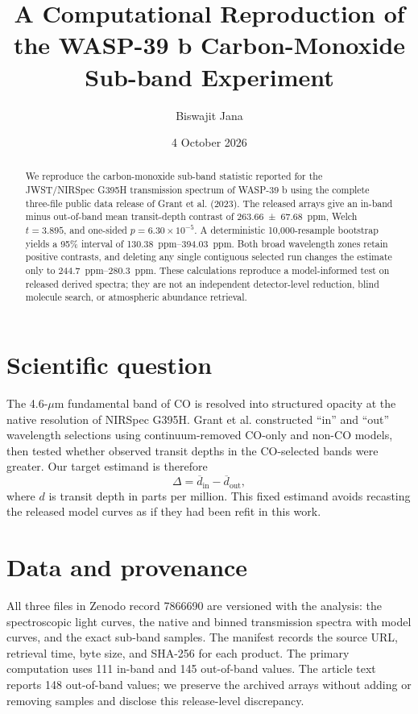 \documentclass[11pt]{article}
\title{A Computational Reproduction of the WASP-39 b Carbon-Monoxide Sub-band Experiment}
\author{Biswajit Jana}
\date{4 October 2026}
\begin{document}
\maketitle

\begin{abstract}
We reproduce the carbon-monoxide sub-band statistic reported for the
JWST/NIRSpec G395H transmission spectrum of WASP-39 b using the complete
three-file public data release of Grant et al. (2023).  The released arrays
give an in-band minus out-of-band mean transit-depth contrast of
\SI{263.66 +- 67.68}{ppm}, Welch $t=3.895$, and one-sided
$p=6.30\times10^{-5}$.  A deterministic 10,000-resample bootstrap yields a
95\% interval of \SIrange{130.38}{394.03}{ppm}.  Both broad wavelength zones
retain positive contrasts, and deleting any single contiguous selected run
changes the estimate only to \SIrange{244.7}{280.3}{ppm}.  These calculations
reproduce a model-informed test on released derived spectra; they are not an
independent detector-level reduction, blind molecule search, or atmospheric
abundance retrieval.
\end{abstract}

\section{Scientific question}
The 4.6-$\mu$m fundamental band of CO is resolved into structured opacity at
the native resolution of NIRSpec G395H.  Grant et al. constructed ``in'' and
``out'' wavelength selections using continuum-removed CO-only and non-CO
models, then tested whether observed transit depths in the CO-selected bands
were greater.  Our target estimand is therefore
\begin{equation}
  \Delta = \overline{d}_{\mathrm{in}}-\overline{d}_{\mathrm{out}},
\end{equation}
where $d$ is transit depth in parts per million.  This fixed estimand avoids
recasting the released model curves as if they had been refit in this work.

\section{Data and provenance}
All three files in Zenodo record 7866690 are versioned with the analysis:
the spectroscopic light curves, the native and binned transmission spectra
with model curves, and the exact sub-band samples.  The manifest records the
source URL, retrieval time, byte size, and SHA-256 for each product.  The
primary computation uses 111 in-band and 145 out-of-band values.  The article
text reports 148 out-of-band values; we preserve the archived arrays without
adding or removing samples and disclose this release-level discrepancy.
\end{document}
